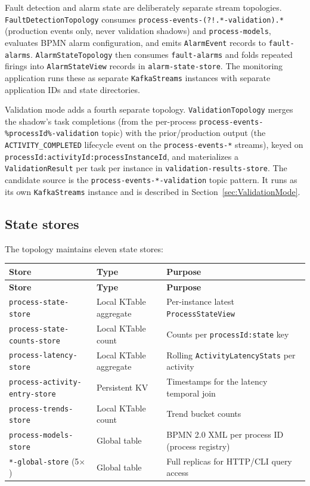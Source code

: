 Fault detection and alarm state are deliberately separate stream topologies.
\texttt{FaultDetectionTopology} consumes \texttt{process-events-(?!.*-validation).*}
(production events only, never validation shadows) and
\texttt{process-models}, evaluates BPMN alarm configuration, and emits
\texttt{AlarmEvent} records to \texttt{fault-alarms}. \texttt{AlarmStateTopology}
then consumes \texttt{fault-alarms} and folds repeated firings into
\texttt{AlarmStateView} records in \texttt{alarm-state-store}. The monitoring
application runs these as separate \texttt{KafkaStreams} instances with separate
application IDs and state directories.

Validation mode adds a fourth separate topology. \texttt{ValidationTopology}
merges the shadow's task completions (from the per-process \texttt{process-events-\%processId\%-validation} topic)
with the prior/production output (the \texttt{ACTIVITY\_COMPLETED} lifecycle event on
the \texttt{process-events-*} streams), keyed on
\texttt{processId:activityId:processInstanceId}, and materializes a \\
\texttt{ValidationResult} per task per instance in \texttt{validation-results-store}. The
candidate source is the \texttt{process-events-*-validation} topic pattern.
It runs as its own \texttt{KafkaStreams} instance and is described in
Section~\ref{sec:ValidationMode}.

\subsection{State stores}

The topology maintains eleven state stores:

\newcommand{\storetable}[1]{%
\begin{longtable}{|>{\raggedright\arraybackslash}p{0.40\textwidth}|>{\raggedright\arraybackslash}p{0.20\textwidth}|>{\raggedright\arraybackslash}p{0.32\textwidth}|}
\hline
\rowcolor[gray]{0.9}\textbf{Store} & \textbf{Type} & \textbf{Purpose} \\
\hline
\endfirsthead
\hline
\rowcolor[gray]{0.9}\textbf{Store} & \textbf{Type} & \textbf{Purpose} \\
\hline
\endhead
#1
\end{longtable}
}

\storetable{
\texttt{process-state-store} & Local KTable aggregate & Per-instance latest \texttt{ProcessStateView} \\
\texttt{process-state-counts-store} & Local KTable count & Counts per \texttt{processId:state} key \\
\texttt{process-latency-store} & Local KTable aggregate & Rolling \texttt{ActivityLatencyStats} per activity \\
\texttt{process-activity-entry-store} & Persistent KV & Timestamps for the latency temporal join \\
\texttt{process-trends-store} & Local KTable count & Trend bucket counts \\
\texttt{process-models-store} & Global table & BPMN 2.0 XML per process ID (process registry) \\
\texttt{*-global-store} (5$\times$) & Global table & Full replicas for HTTP/CLI query access \\
}

